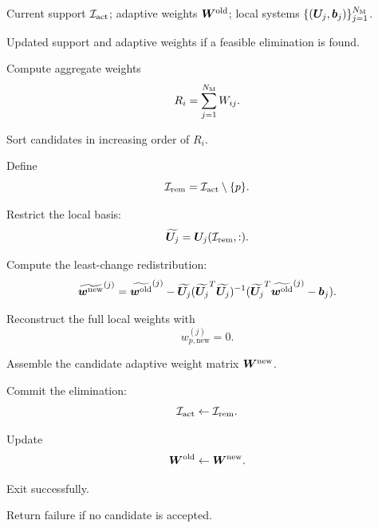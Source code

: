 \documentclass[11pt,a4paper]{article}
\begin{document}
\begin{algorithm}[H]
\caption{No-enforcement least-change pruning}
\label{alg:no_enforcement_pruning}
\begin{algorithmic}[1]

\Require
Current support $\mathcal{I}_{\mathrm{act}}$;
adaptive weights $\bm W^{\mathrm{old}}$;
local systems $\{(\bm U_j,\bm b_j)\}_{j=1}^{N_{\mathrm{M}}}$.

\Ensure
Updated support and adaptive weights if a feasible elimination is found.

\State Compute aggregate weights
\[
        R_i=\sum_{j=1}^{N_{\mathrm{M}}}W_{ij}.
\]

\State Sort candidates in increasing order of $R_i$.


    \State Define
    \[
        \mathcal{I}_{\mathrm{rem}}=\mathcal{I}_{\mathrm{act}}\setminus\{p\}.
    \]


        \State Restrict the local basis:
        \[
            \widetilde{\bm U_j}=\bm U_j(\mathcal{I}_{\mathrm{rem}},:).
        \]

        \State Compute the least-change redistribution:
        \[
            \widetilde{\bm w^{\mathrm{new}}}^{(j)}
            =
            \widetilde{\bm w^{\mathrm{old}}}^{(j)}
            -
            \widetilde{\bm U_j}
            (\widetilde{\bm U_j}^T\widetilde{\bm U_j})^{-1}
            (\widetilde{\bm U_j}^T\widetilde{\bm w^{\mathrm{old}}}^{(j)}-\bm b_j).
        \]

        \State Reconstruct the full local weights with
        \[
            w_{p,\mathrm{new}}^{(j)}=0.
        \]

    \EndFor

    \State Assemble the candidate adaptive weight matrix $\bm W^{\mathrm{new}}$.


        \State Commit the elimination:
        \[
            \mathcal{I}_{\mathrm{act}}\gets\mathcal{I}_{\mathrm{rem}}.
        \]

        \State Update
        \[
            \bm W^{\mathrm{old}}\gets\bm W^{\mathrm{new}}.
        \]

        \State Exit successfully.

    \EndIf

\EndFor

\State Return failure if no candidate is accepted.

\end{algorithmic}
\end{algorithm}

\end{document}
